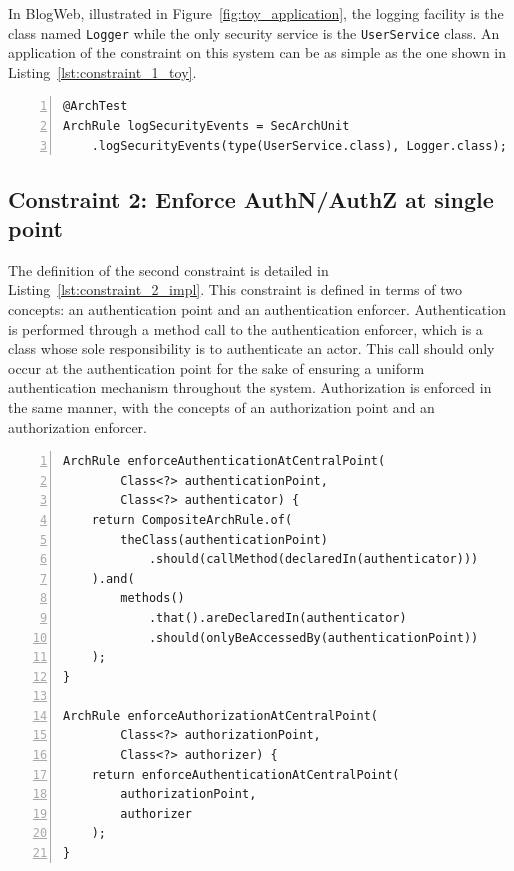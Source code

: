 In BlogWeb, illustrated in Figure~\ref{fig:toy_application}, the logging facility is the class named \texttt{Logger} while the only security service is the \texttt{UserService} class. An application of the constraint on this system can be as simple as the one shown in Listing~\ref{lst:constraint_1_toy}.

\begin{minipage}{\linewidth}
\begin{lstlisting}[caption={Application of constraint 1 to BlogWeb.}, captionpos=b, label=lst:constraint_1_toy, numbers=left]
@ArchTest
ArchRule logSecurityEvents = SecArchUnit
    .logSecurityEvents(type(UserService.class), Logger.class);
\end{lstlisting}
\end{minipage}

\subsection{Constraint 2: Enforce AuthN/AuthZ at single point}
The definition of the second constraint is detailed in Listing~\ref{lst:constraint_2_impl}.
This constraint is defined in terms of two concepts: an authentication point and an authentication enforcer. Authentication is performed through a method call to the authentication enforcer, which is a class whose sole responsibility is to authenticate an actor. This call should only occur at the authentication point for the sake of ensuring a uniform authentication mechanism throughout the system. Authorization is enforced in the same manner, with the concepts of an authorization point and an authorization enforcer.

\begin{minipage}{\linewidth}
\begin{lstlisting}[caption={Rule definitions for constraint 2.}, captionpos=b, label=lst:constraint_2_impl, numbers=left]
ArchRule enforceAuthenticationAtCentralPoint(
        Class<?> authenticationPoint,
        Class<?> authenticator) {
    return CompositeArchRule.of(
        theClass(authenticationPoint)
            .should(callMethod(declaredIn(authenticator)))
    ).and(
        methods()
            .that().areDeclaredIn(authenticator)
            .should(onlyBeAccessedBy(authenticationPoint))
    );
}

ArchRule enforceAuthorizationAtCentralPoint(
        Class<?> authorizationPoint,
        Class<?> authorizer) {
    return enforceAuthenticationAtCentralPoint(
        authorizationPoint,
        authorizer
    );
}
\end{lstlisting}
\end{minipage}

